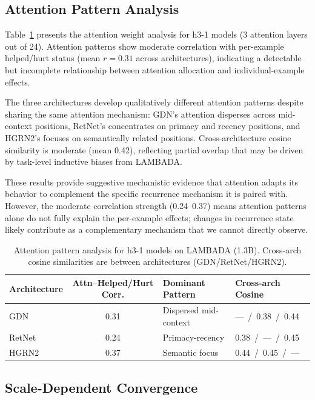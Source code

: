 \documentclass[11pt,a4paper]{article}
\begin{document}
\subsection{Attention Pattern Analysis}
\label{sec:attention}

Table~\ref{tab:attention} presents the attention weight analysis for h3-1 models (3 attention layers out of 24). Attention patterns show moderate correlation with per-example helped/hurt status (mean $r{=}0.31$ across architectures), indicating a detectable but incomplete relationship between attention allocation and individual-example effects.

The three architectures develop qualitatively different attention patterns despite sharing the same attention mechanism: GDN's attention disperses across mid-context positions, RetNet's concentrates on primacy and recency positions, and HGRN2's focuses on semantically related positions. Cross-architecture cosine similarity is moderate (mean 0.42), reflecting partial overlap that may be driven by task-level inductive biases from LAMBADA.

These results provide suggestive mechanistic evidence that attention adapts its behavior to complement the specific recurrence mechanism it is paired with. However, the moderate correlation strength (0.24--0.37) means attention patterns alone do not fully explain the per-example effects; changes in recurrence state likely contribute as a complementary mechanism that we cannot directly observe.

\begin{table}[t]
\centering
\small
\caption{Attention pattern analysis for h3-1 models on LAMBADA (1.3B). Cross-arch cosine similarities are between architectures (GDN/RetNet/HGRN2).}
\label{tab:attention}
\begin{tabular}{@{}lcll@{}}
\toprule
Architecture & Attn--Helped/Hurt Corr. & Dominant Pattern & Cross-arch Cosine \\
\midrule
GDN & 0.31 & Dispersed mid-context & ---~/~0.38~/~0.44 \\
RetNet & 0.24 & Primacy-recency & 0.38~/~---~/~0.45 \\
HGRN2 & 0.37 & Semantic focus & 0.44~/~0.45~/~--- \\
\bottomrule
\end{tabular}
\end{table}

\subsection{Scale-Dependent Convergence}
\label{sec:scale}
\end{document}
